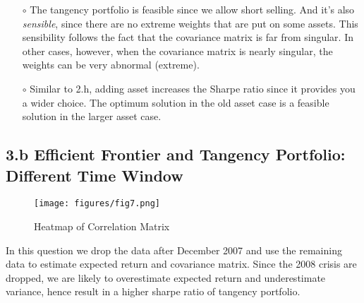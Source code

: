 \documentclass[10 pt]{hwtemplate} %
\begin{document}
\begin{itemize}
  \item[$\circ$] The tangency portfolio is feasible since we allow short selling. And it's also \textit{sensible}, since there are no extreme weights that are put on some assets. This sensibility follows the fact that the covariance matrix is far from singular. In other cases, however, when the covariance matrix is nearly singular, the weights can be very abnormal (extreme).
  \item[$\circ$] Similar to 2.h, adding asset increases the Sharpe ratio since it provides you a wider choice. The optimum solution in the old asset case is a feasible solution in the larger asset case.
\end{itemize}

\subsection*{3.b Efficient Frontier and Tangency Portfolio: Different Time Window}
\begin{figure}[H]
  \centering
  \captionsetup{justification=centering}
  \caption{\label{fig:exretcorr}Heatmap of Correlation Matrix}
  \vspace{-10pt}
  \texttt{[image: figures/fig7.png]}
\end{figure}
In this question we drop the data after December 2007 and use the remaining data to estimate expected return and covariance matrix. Since the 2008 crisis are dropped, we are likely to overestimate expected return and underestimate variance, hence result in a higher sharpe ratio of tangency portfolio.
\end{document}
